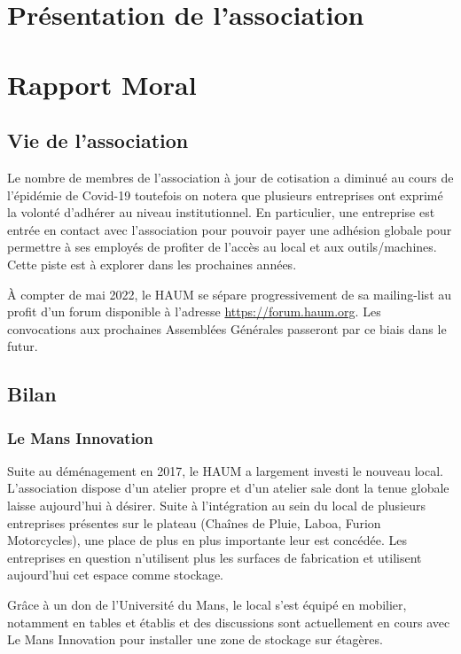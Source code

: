 \documentclass[11pt]{article}
\begin{document}
\section{Présentation de l'association}

\section{Rapport Moral}

\subsection{Vie de l'association}

Le nombre de membres de l'association à jour de cotisation a diminué au cours de l'épidémie de Covid-19 toutefois on notera que plusieurs entreprises ont exprimé la volonté d'adhérer au niveau institutionnel. En particulier, une entreprise est entrée en contact avec l'association pour pouvoir payer une adhésion globale pour permettre à ses employés de profiter de l'accès au local et aux outils/machines. Cette piste est à explorer dans les prochaines années.

À compter de mai 2022, le HAUM se sépare progressivement de sa mailing-list au profit d'un forum 
disponible à l'adresse \url{https://forum.haum.org}. Les convocations aux prochaines Assemblées Générales passeront par ce biais dans le futur.

\subsection{Bilan}

\subsubsection{Le Mans Innovation}

Suite au déménagement en 2017, le HAUM a largement investi le nouveau local. L'association dispose d'un atelier propre et d'un atelier sale dont la tenue globale laisse aujourd'hui à désirer. Suite à l'intégration au sein du local de plusieurs entreprises présentes sur le plateau (Chaînes de Pluie, Laboa, Furion Motorcycles), une place de plus en plus importante leur est concédée. Les entreprises en question n'utilisent plus les surfaces de fabrication et utilisent aujourd'hui cet espace comme stockage.

Grâce à un don de l'Université du Mans, le local s'est équipé en mobilier, notamment en tables et établis et des discussions sont actuellement en cours avec Le Mans Innovation pour installer une zone de stockage sur étagères. 
\end{document}
